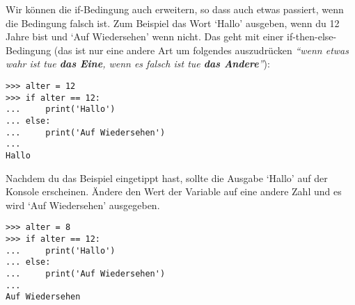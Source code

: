 Wir können die if-Bedingung auch erweitern, so dass auch etwas passiert, wenn die Bedingung falsch ist. Zum Beispiel das Wort `Hallo' ausgeben, wenn du 12 Jahre bist und `Auf Wiedersehen' wenn nicht. Das geht mit einer if-then-else-Bedingung (das ist nur eine andere Art um folgendes auszudrücken \emph{``wenn etwas wahr ist tue \textbf{das Eine}, wenn es falsch ist tue \textbf{das Andere}''}):

\begin{listing}
\begin{verbatim}
>>> alter = 12
>>> if alter == 12:
...     print('Hallo')
... else:
...     print('Auf Wiedersehen')
...
Hallo
\end{verbatim}
\end{listing}

Nachdem du das Beispiel eingetippt hast, sollte die Ausgabe `Hallo' auf der Konsole erscheinen. Ändere den Wert der Variable  auf eine andere Zahl und es wird `Auf Wiedersehen' ausgegeben.


\begin{listing}
\begin{verbatim}
>>> alter = 8
>>> if alter == 12:
...     print('Hallo')
... else:
...     print('Auf Wiedersehen')
...
Auf Wiedersehen
\end{verbatim}
\end{listing}

